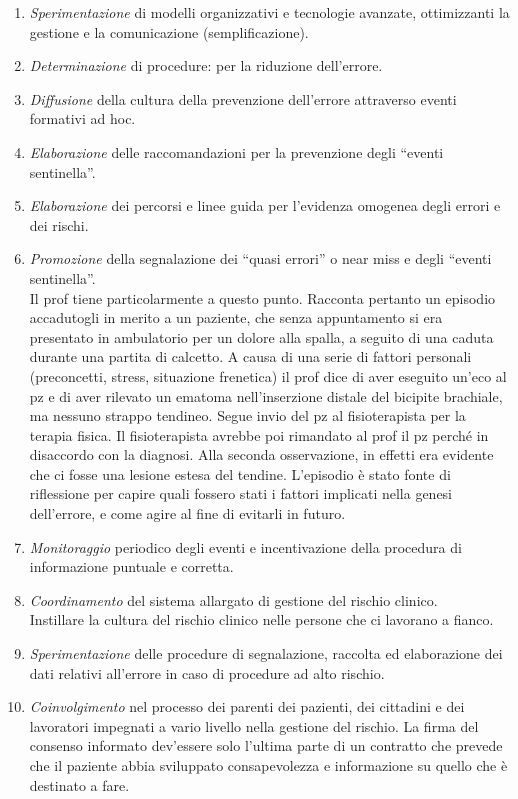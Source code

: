 \documentclass[]{article}
\begin{document}
\begin{enumerate}
\def\labelenumi{\arabic{enumi}.}
\item
  \emph{Sperimentazione} di modelli organizzativi e tecnologie avanzate,
  ottimizzanti la gestione e la comunicazione (semplificazione).
\item
  \emph{Determinazione} di procedure: per la riduzione dell'errore.
\item
  \emph{Diffusione} della cultura della prevenzione dell'errore
  attraverso eventi formativi ad hoc.
\item
  \emph{Elaborazione} delle raccomandazioni per la prevenzione degli
  ``eventi sentinella''.
\item
  \emph{Elaborazione} dei percorsi e linee guida per l'evidenza omogenea
  degli errori e dei rischi.
\item
  \emph{Promozione} della segnalazione dei ``quasi errori'' o near miss
  e degli ``eventi sentinella''.\\
  Il prof tiene particolarmente a questo punto. Racconta pertanto un
  episodio accadutogli in merito a un paziente, che senza appuntamento
  si era presentato in ambulatorio per un dolore alla spalla, a seguito
  di una caduta durante una partita di calcetto. A causa di una serie di
  fattori personali (preconcetti, stress, situazione frenetica) il prof
  dice di aver eseguito un'eco al pz e di aver rilevato un ematoma
  nell'inserzione distale del bicipite brachiale, ma nessuno strappo
  tendineo. Segue invio del pz al fisioterapista per la terapia fisica.
  Il fisioterapista avrebbe poi rimandato al prof il pz perché in
  disaccordo con la diagnosi. Alla seconda osservazione, in effetti era
  evidente che ci fosse una lesione estesa del tendine. L'episodio è
  stato fonte di riflessione per capire quali fossero stati i fattori
  implicati nella genesi dell'errore, e come agire al fine di evitarli
  in futuro.
\item
  \emph{Monitoraggio} periodico degli eventi e incentivazione della
  procedura di informazione puntuale e corretta.
\item
  \emph{Coordinamento} del sistema allargato di gestione del rischio
  clinico.\\
  Instillare la cultura del rischio clinico nelle persone che ci
  lavorano a fianco.
\item
  \emph{Sperimentazione} delle procedure di segnalazione, raccolta ed
  elaborazione dei dati relativi all'errore in caso di procedure ad alto
  rischio.
\item
  \emph{Coinvolgimento} nel processo dei parenti dei pazienti, dei
  cittadini e dei lavoratori impegnati a vario livello nella gestione
  del rischio. La firma del consenso informato dev'essere solo l'ultima
  parte di un contratto che prevede che il paziente abbia sviluppato
  consapevolezza e informazione su quello che è destinato a fare.
\end{enumerate}
\end{document}
